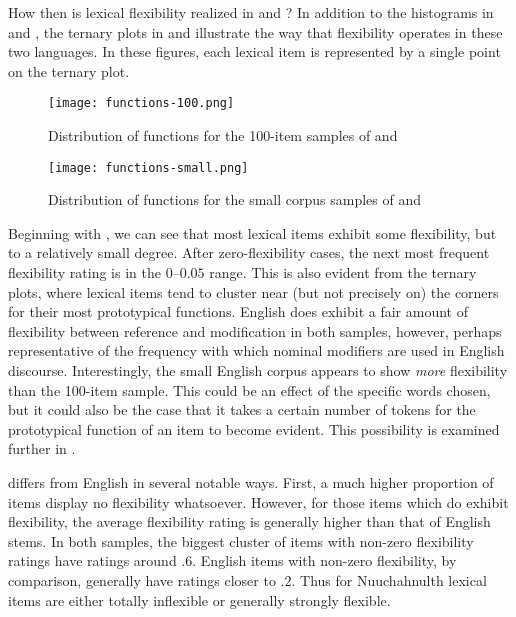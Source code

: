 How then is lexical flexibility realized in  and ? In addition to the histograms in  and , the ternary plots in  and  illustrate the way that flexibility operates in these two languages. In these figures, each lexical item is represented by a single point on the ternary plot.

\begin{figure}[h!]
  \centering
  \caption{Distribution of functions for the 100-item samples of  and }
  \label{fig:ternary-100-items}
  \texttt{[image: functions-100.png]}
\end{figure}

\begin{figure}[h!]
  \centering
  \caption{Distribution of functions for the small corpus samples of  and }
  \label{fig:ternary-small-corpus}
  \texttt{[image: functions-small.png]}
\end{figure}

Beginning with , we can see that most lexical items exhibit some flexibility, but to a relatively small degree. After zero-flexibility cases, the next most frequent flexibility rating is in the $0$–$0.05$ range. This is also evident from the ternary plots, where lexical items tend to cluster near (but not precisely on) the corners for their most prototypical functions. English does exhibit a fair amount of flexibility between reference and modification in both samples, however, perhaps representative of the frequency with which nominal modifiers are used in English discourse. Interestingly, the small English corpus appears to show \emph{more} flexibility than the 100-item sample. This could be an effect of the specific words chosen, but it could also be the case that it takes a certain number of tokens for the prototypical function of an item to become evident. This possibility is examined further in .

 differs from English in several notable ways. First, a much higher proportion of items display no flexibility whatsoever. However, for those items which do exhibit flexibility, the average flexibility rating is generally higher than that of English stems. In both samples, the biggest cluster of items with non-zero flexibility ratings have ratings around $.6$. English items with non-zero flexibility, by comparison, generally have ratings closer to $.2$. Thus for Nuuchahnulth lexical items are either totally inflexible or generally strongly flexible.

